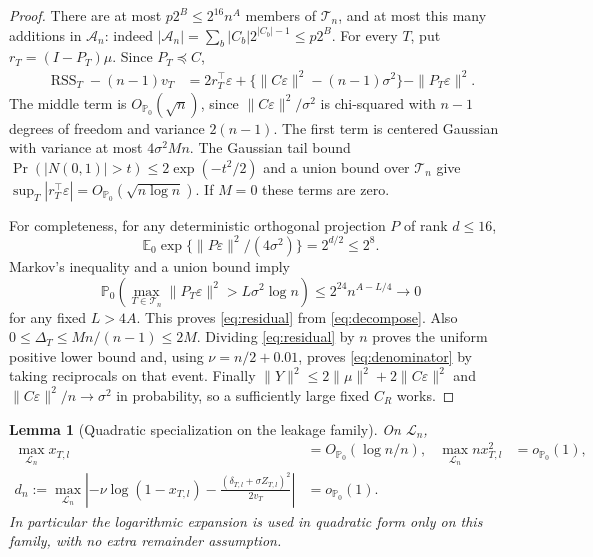 \documentclass[11pt]{article}
\newtheorem{lemma}{Lemma}
\theoremstyle{remark}\newtheorem{remark}{Remark}
\newcommand{\PP}{\mathbb P_0}
\newcommand{\EE}{\mathbb E_0}
\newcommand{\op}{o_{\PP}}
\newcommand{\Op}{O_{\PP}}
\newcommand{\RSS}{\operatorname{RSS}}
\newcommand{\Lc}{\mathcal L_n}
\newcommand{\Ac}{\mathcal A_n}
\newcommand{\Tc}{\mathcal T_n}
\begin{document}
\begin{proof}
There are at most $p2^B\le2^{16}n^A$ members of $\Tc$, and at most this
many additions in $\Ac$: indeed
$|\Ac|=\sum_b|C_b|2^{|C_b|-1}\le p2^B$.
For every $T$, put $r_T=(I-P_T)\mu$. Since $P_T\preceq C$,
\begin{align}
 \RSS_T-(n-1)v_T
 &=2r_T^\top\varepsilon+
   \{\|C\varepsilon\|^2-(n-1)\sigma^2\}
   -\|P_T\varepsilon\|^2.\label{eq:decompose}
\end{align}
The middle term is $\Op(\sqrt n)$, since
$\|C\varepsilon\|^2/\sigma^2$ is chi-squared with $n-1$ degrees of
freedom and variance $2(n-1)$. The first term is centered Gaussian with
variance at most $4\sigma^2 Mn$. The Gaussian tail bound
$\Pr(|N(0,1)|>t)\le2\exp(-t^2/2)$ and a union bound over $\Tc$ give
$\sup_T|r_T^\top\varepsilon|=\Op(\sqrt{n\log n})$.
If $M=0$ these terms are zero.

For completeness, for any deterministic orthogonal projection $P$ of
rank $d\le16$,
\[
 \EE\exp\{\|P\varepsilon\|^2/(4\sigma^2)\}=2^{d/2}\le2^8.
\]
Markov's inequality and a union bound imply
\[
 \PP\!\left(\max_{T\in\Tc}\|P_T\varepsilon\|^2>
             L\sigma^2\log n\right)
 \le2^{24}n^{A-L/4}\to0
\]
for any fixed $L>4A$. This proves \eqref{eq:residual} from
\eqref{eq:decompose}. Also $0\le\Delta_T\le Mn/(n-1)\le2M$.
Dividing \eqref{eq:residual} by $n$ proves the uniform positive lower bound
and, using $\nu=n/2+0.01$, proves \eqref{eq:denominator} by taking reciprocals
on that event. Finally
$\|Y\|^2\le2\|\mu\|^2+2\|C\varepsilon\|^2$ and
$\|C\varepsilon\|^2/n\to\sigma^2$ in probability, so a sufficiently
large fixed $C_R$ works.
\end{proof}

\begin{lemma}[Quadratic specialization on the leakage family]\label{lem:quad}
On $\Lc$,
\begin{align}
 \max_{\Lc}x_{T,l}&=\Op(\log n/n),&
 \max_{\Lc}n x_{T,l}^2&=\op(1),\label{eq:smallx}\\
 d_n:=\max_{\Lc}\left|
 -\nu\log(1-x_{T,l})-
 \frac{(\delta_{T,l}+\sigma Z_{T,l})^2}{2v_T}\right|&=\op(1).
 \label{eq:quad}
\end{align}
In particular the logarithmic expansion is used in quadratic form only on
this family, with no extra remainder assumption.
\end{lemma}
\end{document}

